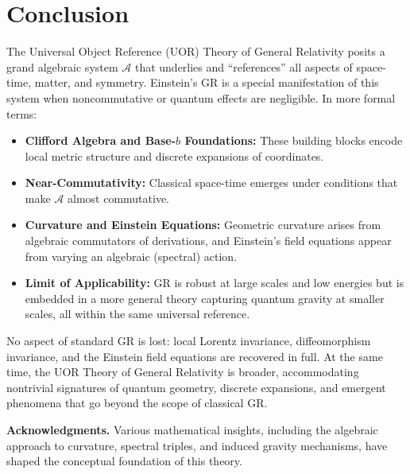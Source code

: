 \documentclass[11pt]{article}
\begin{document}
\section{Conclusion}
The Universal Object Reference (UOR) Theory of General Relativity posits a grand algebraic system $\mathcal{A}$ that underlies and “references” all aspects of space-time, matter, and symmetry. Einstein’s GR is a special manifestation of this system when noncommutative or quantum effects are negligible. In more formal terms:

\begin{itemize}
\item \textbf{Clifford Algebra and Base-$b$ Foundations:} These building blocks encode local metric structure and discrete expansions of coordinates.
\item \textbf{Near-Commutativity:} Classical space-time emerges under conditions that make $\mathcal{A}$ almost commutative.  
\item \textbf{Curvature and Einstein Equations:} Geometric curvature arises from algebraic commutators of derivations, and Einstein’s field equations appear from varying an algebraic (spectral) action.
\item \textbf{Limit of Applicability:} GR is robust at large scales and low energies but is embedded in a more general theory capturing quantum gravity at smaller scales, all within the same universal reference.
\end{itemize}

No aspect of standard GR is lost: local Lorentz invariance, diffeomorphism invariance, and the Einstein field equations are recovered in full. At the same time, the UOR Theory of General Relativity is broader, accommodating nontrivial signatures of quantum geometry, discrete expansions, and emergent phenomena that go beyond the scope of classical GR. 

\vspace{1em}
\noindent
\textbf{Acknowledgments.} Various mathematical insights, including the algebraic approach to curvature, spectral triples, and induced gravity mechanisms, have shaped the conceptual foundation of this theory.
\end{document}
